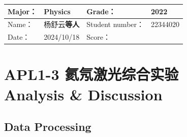 
\begin{table}
	\renewcommand\arraystretch{1.7}
	\begin{tabularx}{\textwidth}{|X|X|X|X|}
		\hline
		Major：& Physics &Grade：& 2022\\
		\hline
		Name： & 杨舒云\textbf{等人} & Student number：& 22344020\\
		\hline
		Date：& 2024/10/18 & Score： &\\
		\hline
	\end{tabularx}
\end{table}
\section{APL1-3 氦氖激光综合实验 \\ Analysis \& Discussion}


\subsection{Data Processing}

